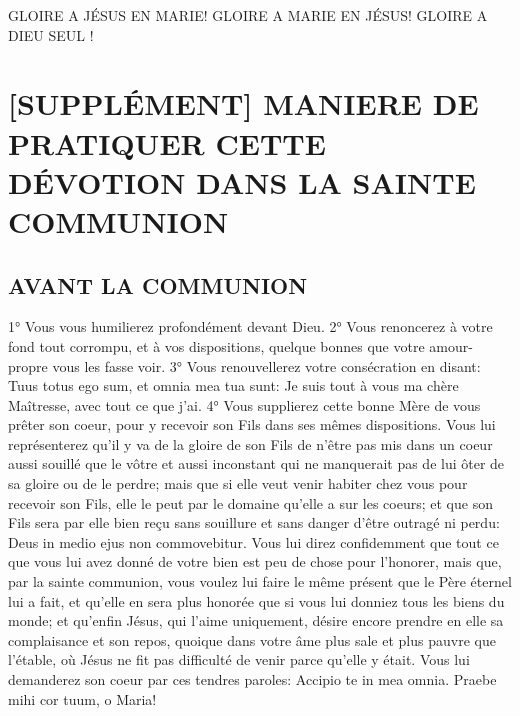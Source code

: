 GLOIRE A JÉSUS EN MARIE!
GLOIRE A MARIE EN JÉSUS!
GLOIRE A DIEU SEUL !

\section{[SUPPLÉMENT] MANIERE DE PRATIQUER CETTE DÉVOTION DANS LA SAINTE COMMUNION}
\subsection{AVANT LA COMMUNION}
 1° Vous vous humilierez profondément devant Dieu. 2° Vous renoncerez à votre fond tout corrompu, et à vos
dispositions, quelque bonnes que votre amour-propre vous les fasse voir. 3° Vous renouvellerez votre
consécration en disant: Tuus totus ego sum, et omnia mea tua sunt: Je suis tout à vous ma chère Maîtresse, avec
tout ce que j'ai. 4° Vous supplierez cette bonne Mère de vous prêter son coeur, pour y recevoir son Fils dans ses
mêmes dispositions. Vous lui représenterez qu'il y va de la gloire de son Fils de n'être pas mis dans un coeur aussi
souillé que le vôtre et aussi inconstant qui ne manquerait pas de lui ôter de sa gloire ou de le perdre; mais que si
elle veut venir habiter chez vous pour recevoir son Fils, elle le peut par le domaine qu'elle a sur les coeurs; et que
son Fils sera par elle bien reçu sans souillure et sans danger d'être outragé ni perdu: Deus in medio ejus non
commovebitur. Vous lui direz confidemment que tout ce que vous lui avez donné de votre bien est peu de chose
pour l'honorer, mais que, par la sainte communion, vous voulez lui faire le même présent que le Père éternel lui a
fait, et qu'elle en sera plus honorée que si vous lui donniez tous les biens du monde; et qu'enfin Jésus, qui l'aime
uniquement, désire encore prendre en elle sa complaisance et son repos, quoique dans votre âme plus sale et
plus pauvre que l'étable, où Jésus ne fit pas difficulté de venir parce qu'elle y était. Vous lui demanderez son coeur
par ces tendres paroles: Accipio te in mea omnia. Praebe mihi cor tuum, o Maria!

